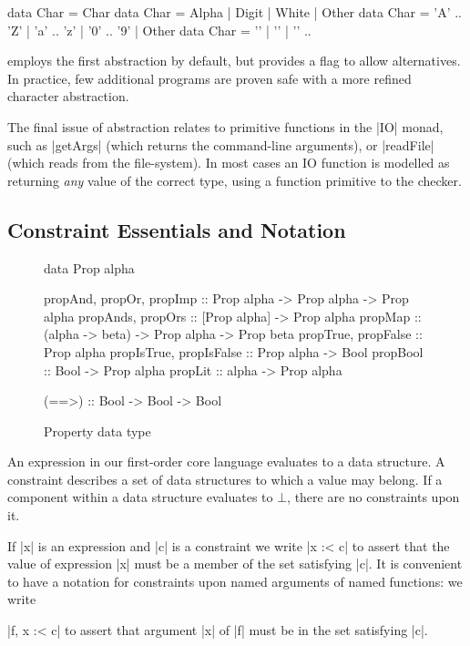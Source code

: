 \ignore\begin{code}
data Char = Char
data Char = Alpha | Digit | White | Other
data Char = 'A' .. 'Z' | 'a' .. 'z' | '0' .. '9' | Other
data Char = '\0' | '\1' | '\2' ..
\end{code}

\noindent \catch{} employs the first abstraction by default, but provides a flag to allow alternatives. In practice, few additional programs are proven safe with a more refined character abstraction.

The final issue of abstraction relates to primitive functions in the |IO| monad, such as |getArgs| (which returns the command-line arguments), or |readFile| (which reads from the file-system). In most cases an IO function is modelled as returning \textit{any} value of the correct type, using a function primitive to the checker.

\subsection{Constraint Essentials and Notation}
\label{sec:constraints}

\begin{figure}
\begin{code}
data Prop alpha

propAnd, propOr, propImp  :: Prop alpha -> Prop alpha -> Prop alpha
propAnds, propOrs         :: [Prop alpha] -> Prop alpha
propMap                   :: (alpha -> beta) -> Prop alpha -> Prop beta
propTrue, propFalse       :: Prop alpha
propIsTrue, propIsFalse   :: Prop alpha -> Bool
propBool                  :: Bool -> Prop alpha
propLit                   :: alpha -> Prop alpha

(==>) :: Bool -> Bool -> Bool
\end{code}
\caption{Property data type}
\label{fig:prop}
\figureend
\end{figure}

An expression in our first-order core language evaluates to a data structure. A constraint describes a set of data structures to which a value may belong. If a component within a data structure evaluates to $\bot{}$, there are no constraints upon it.

If |x| is an expression and |c| is a constraint we write |x :< c| to assert that the value of expression |x| must be a member of the set satisfying |c|. It is convenient to have a notation for constraints upon named arguments of named functions: we write \ignore|f, x :< c| to assert that argument |x| of |f| must be in the set satisfying |c|.

